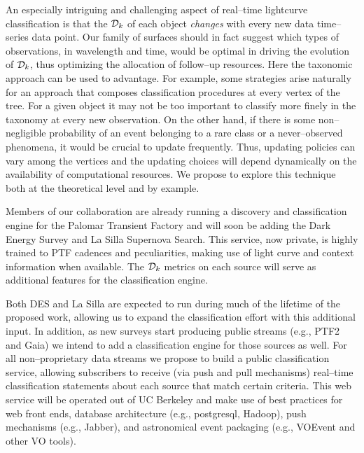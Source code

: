 An especially intriguing and challenging aspect of real--time lightcurve
classification is that the ${\cal D}_k$ of each object \emph{changes} with every
new data time--series data point. Our family of surfaces should in fact suggest
which types of observations, in wavelength and time, would be optimal in driving
the evolution of ${\cal D}_k$, thus optimizing the allocation of follow--up
resources.  Here the taxonomic approach can be used to advantage. For example,
some strategies arise naturally for an approach that composes classification
procedures at every vertex of the tree. For a given object it may not be too
important to classify more finely in the taxonomy at every new observation.  On
the other hand, if there is some non--negligible probability of an event
belonging to a rare class or a never--observed phenomena, it would be crucial to
update frequently.  Thus, updating policies can vary among the vertices and the
updating choices will depend dynamically on the availability of computational
resources. We propose to explore this technique both at the theoretical level
and by example.

 \smallskip

Members of our collaboration are already running a discovery and classification
engine for the Palomar Transient Factory and will soon be adding the Dark Energy
Survey and La Silla Supernova Search.  This service, now private, is highly
trained to PTF cadences and peculiarities, making use of light curve and context
information when available. The ${\cal D}_k$ metrics on each source will serve
as additional features for the classification engine.

Both DES and La Silla are expected to run during much of the lifetime of the
proposed work, allowing us to expand the classification effort with this
additional input. In addition, as new surveys start producing public streams
(e.g., PTF2 and Gaia) we intend to add a classification engine for those sources
as well.  For all non--proprietary data streams we propose to build a public
classification service, allowing subscribers to receive (via push and pull
mechanisms) real--time classification statements about each source that match
certain criteria. This web service will be operated out of UC Berkeley and make
use of best practices for web front ends, database architecture (e.g.,
postgresql, Hadoop), push mechanisms (e.g., Jabber), and astronomical event
packaging (e.g., VOEvent and other VO tools).


